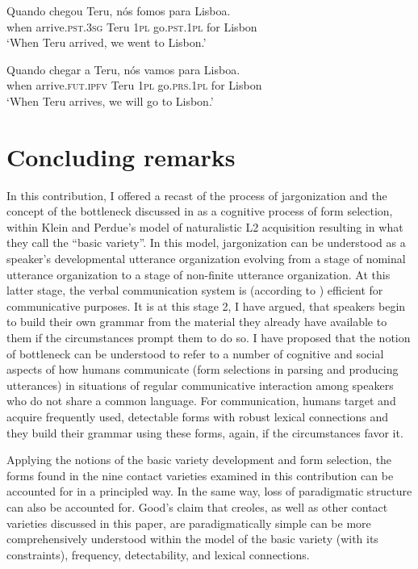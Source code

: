 \documentclass[output=paper,colorlinks,citecolor=brown]{langscibook}
\begin{document}
\ea{\label{bkm:clements8}}
\ea
\gll Quando chegou     Teru,     nós     fomos     para    Lisboa.\\
when    arrive.\textsc{pst.3sg} Teru    \textsc{1pl}    go.\textsc{pst.1pl}    for     Lisbon\\
\glt  ‘When Teru arrived, we went to Lisbon.’

\ex
\gll Quando chegar            a     Teru,     nós     vamos        para Lisboa.\\
     when   arrive.\textsc{fut.ipfv} Teru \textsc{1pl}    go.\textsc{prs.1pl}    for Lisbon\\
\glt `When Teru arrives, we will go to Lisbon.'

\z
\z


\section{Concluding remarks}

In this contribution, I offered a recast of the process of jargonization and the concept of the bottleneck discussed in  \citet{Good2012} as a cognitive process of form selection, within Klein and Perdue's model of naturalistic L2 acquisition resulting in what they call the “basic variety”. In this model, jargonization can be understood as a speaker's developmental utterance organization evolving from a stage of nominal utterance organization to a stage of non-finite utterance organization. At this latter stage, the verbal communication system is (according to \citealt{KleinPerdue1992,KleinPerdue1997}) efficient for communicative purposes. It is at this stage 2, I have argued, that speakers begin to build their own grammar from the material they already have available to them if the circumstances prompt them to do so. I have proposed that the notion of bottleneck can be understood to refer to a number of cognitive and social aspects of how humans communicate (form selections in parsing and producing utterances) in situations of regular communicative interaction among speakers who do not share a common language. For communication, humans target and acquire frequently used, detectable forms with robust lexical connections and they build their grammar using these forms, again, if the circumstances favor it.

 Applying the notions of the basic variety development and form selection, the forms found in the nine contact varieties examined in this contribution can be accounted for in a principled way. In the same way, loss of paradigmatic structure can also be accounted for. Good's claim that creoles, as well as other contact varieties discussed in this paper, are paradigmatically simple can be more comprehensively understood within the model of the basic variety (with its constraints), frequency, detectability, and lexical connections.
\end{document}
